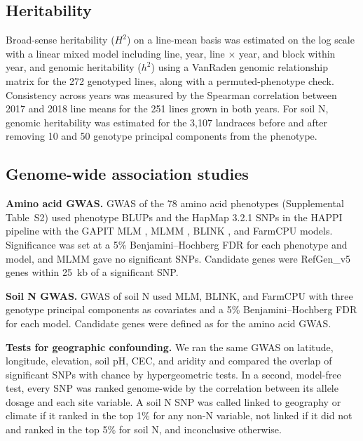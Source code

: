 \documentclass[namedate,unnumsec,webpdf,contemporary,large]{oup-authoring-template}
\begin{document}
\subsection{Heritability}
Broad-sense heritability ($H^2$) on a line-mean basis was estimated on the log scale with a linear mixed model including line, year, line $\times$ year, and block within year, and genomic heritability ($h^2$) using a VanRaden genomic relationship matrix for the 272 genotyped lines, along with a permuted-phenotype check. Consistency across years was measured by the Spearman correlation between 2017 and 2018 line means for the 251 lines grown in both years. For soil N, genomic heritability was estimated for the 3,107 landraces before and after removing 10 and 50 genotype principal components from the phenotype.

\subsection{Genome-wide association studies}

\noindent\textbf{Amino acid GWAS.} GWAS of the 78 amino acid phenotypes (Supplemental Table~S2) used phenotype BLUPs and the HapMap 3.2.1 SNPs in the HAPPI pipeline \citep{Slaten2020HAPPI} with the GAPIT \citep{Wang2021GAPIT3} MLM \citep{Yu2006MLM}, MLMM \citep{Segura2012MLMM}, BLINK \citep{Huang2019BLINK}, and FarmCPU \citep{Liu2016FarmCPU} models. Significance was set at a 5\% Benjamini--Hochberg FDR \citep{Benjamini1995FDR} for each phenotype and model, and MLMM gave no significant SNPs. Candidate genes were RefGen\_v5 genes within 25~kb of a significant SNP.

\noindent\textbf{Soil N GWAS.} GWAS of soil N used MLM, BLINK, and FarmCPU with three genotype principal components as covariates and a 5\% Benjamini--Hochberg FDR for each model. Candidate genes were defined as for the amino acid GWAS.

\noindent\textbf{Tests for geographic confounding.} We ran the same GWAS on latitude, longitude, elevation, soil pH, CEC, and aridity and compared the overlap of significant SNPs with chance by hypergeometric tests. In a second, model-free test, every SNP was ranked genome-wide by the correlation between its allele dosage and each site variable. A soil N SNP was called linked to geography or climate if it ranked in the top 1\% for any non-N variable, not linked if it did not and ranked in the top 5\% for soil N, and inconclusive otherwise.
\end{document}
